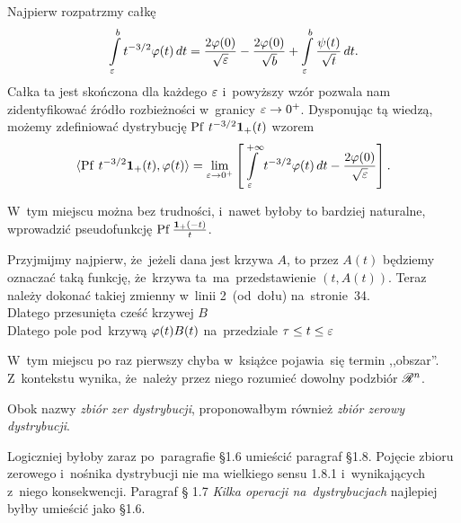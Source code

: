 \documentclass[a4paper,11pt]{article}
\begin{document}
Najpierw rozpatrzmy całkę
\begin{equation}
  \label{eq:Zem-s01-02}
  \int\limits_{ \varepsilon }^{ b } t^{ -3/2 } \varphi( t ) \, dt
  = \frac{ 2 \varphi( 0 ) }{ \sqrt{ \varepsilon } } - \frac{ 2 \varphi( 0 ) }{ \sqrt{ b } }
  + \int\limits_{ \varepsilon }^{ b } \frac{ \psi( t ) }{ \sqrt{ t } } \, dt.
\end{equation}
Całka ta jest skończona dla każdego $\varepsilon$ i~powyższy wzór pozwala
nam zidentyfikować źródło rozbieżności w~granicy $\varepsilon \to 0^{ + }$.
Dysponując tą wiedzą, możemy zdefiniować dystrybucję
$\mathrm{Pf}\, \, t^{ -3/2 } \mathbf{1}_{ + }( t )$ wzorem
\begin{equation}
  \label{eq:Zem-s01-03}
  \langle \mathrm{Pf}\, \, t^{ -3/2 } \mathbf{1}_{ + }( t ), \varphi( t ) \rangle = \lim\limits_{ \varepsilon \to 0^{ + } }
  \left[ \int\limits_{ \varepsilon }^{ +\infty } t^{ -3/2 } \varphi( t ) \, dt
    - \frac{ 2 \varphi( 0 ) }{ \sqrt{ \varepsilon } } \right].
\end{equation}

\vspace{\spaceFour}


\start {} W~tym miejscu można bez trudności, i~nawet byłoby to
bardziej naturalne, wprowadzić pseudofunkcję
$\mathrm{Pf}\, \frac{ \mathbf{1}_{ + }( -t )}{ t }$.

\vspace{\spaceFour}


\start {} Przyjmijmy najpierw, że~jeżeli dana jest krzywa
$A$, to przez $A( t )$ będziemy oznaczać taką funkcję, że~krzywa
ta~ma~przedstawienie $( t, A( t ) )$. Teraz należy dokonać takiej
zmienny w~linii 2~(od~dołu) na~stronie~34. \\
\Jest Dlatego przesunięta cześć krzywej $B$ \\
\Pow Dlatego pole pod~krzywą $\varphi( t ) B( t )$ na~przedziale
$\tau \leq t \leq \varepsilon$

\vspace{\spaceFour}


\start {} W~tym miejscu po raz pierwszy chyba w~książce
pojawia~się termin ,,obszar''. Z~kontekstu wynika, że~należy przez
niego rozumieć dowolny podzbiór $\mathcal{R}^{ n }$.

\vspace{\spaceFour}


\start {} Obok nazwy \emph{zbiór zer dystrybucji}, proponowałbym
również \emph{zbiór zerowy dystrybucji}.

\vspace{\spaceFour}


\start {} Logiczniej byłoby zaraz po~paragrafie \S 1.6 umieścić
paragraf \S 1.8. Pojęcie zbioru zerowego i~nośnika dystrybucji nie ma
wielkiego sensu 1.8.1 i~wynikających z~niego konsekwencji. Paragraf \S
1.7 \emph{Kilka operacji na~dystrybucjach} najlepiej byłby umieścić
jako \S 1.6.
\end{document}

